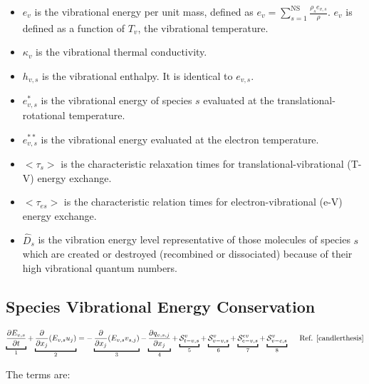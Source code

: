 \documentclass[10pt]{article}
\begin{document}
\begin{flushleft}
\begin{itemize}
    \item $e_v$ is the vibrational energy per unit mass, defined as $\displaystyle e_v = \sum_{s=1}^\text{NS} \frac{\rho_s e_{v,s}}{\rho}$. $e_v$ is defined as a function of $T_v$, the vibrational temperature.
    \item $\kappa_v$ is the vibrational thermal conductivity.
    \item $h_{v,s}$ is the vibrational enthalpy. It is identical to $e_{v,s}$.
    \item $e_{v,s}^*$ is the vibrational energy of species $s$ evaluated at the translational-rotational temperature.
    \item $e_{v,s}^{**}$ is the vibrational energy evaluated at the electron temperature. 
    \item $<\tau_s>$ is the characteristic relaxation times for translational-vibrational (T-V) energy exchange.
    \item $<\tau_{es}>$ is the characteristic relation times for electron-vibrational (e-V) energy exchange.
    \item $\hat{D}_s$ is the vibration energy level representative of those molecules of species $s$ which are created or destroyed (recombined or dissociated) because of their high vibrational quantum numbers.
\end{itemize}

\subsection{Species Vibrational Energy Conservation}

\begin{multline}
    \ub{\pd{E_{v,s}}{t}}{1} + \ub{\pd{}{x_j} (E_{v,s} u_j)}{2} = - \ub{\pd{}{x_j} (E_{v,s} v_{s,j})}{3} - \ub{\pd{q_{v,s,j}}{x_j}}{4} + \ub{\mathcal{S}_{t-v,s}^{v}}{5} + \ub{\mathcal{S}_{v-v,s}^{v}}{6} + \ub{\mathcal{S}_{e-v,s}^{ev}}{7} + \ub{\mathcal{S}_{v-c,s}^{v}}{8} \hspace{5mm} \text{Ref. \cite{candlerthesis}}
\end{multline}

The terms are:


\end{flushleft}
\end{document}
